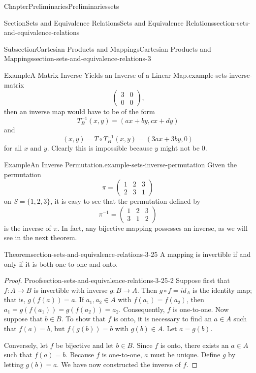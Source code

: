 \documentclass[oneside,10pt,]{book}
\numberwithin{equation}{section}
\begin{document}
\begin{chapterptx}{Chapter}{Preliminaries}{}{Preliminaries}{}{}{sets}
\begin{sectionptx}{Section}{Sets and Equivalence Relations}{}{Sets and Equivalence Relations}{}{}{section-sets-and-equivalence-relations}
\begin{subsectionptx}{Subsection}{Cartesian Products and Mappings}{}{Cartesian Products and Mappings}{}{}{section-sets-and-equivalence-relations-3}
\begin{example}{Example}{A Matrix Inverse Yields an Inverse of a Linear Map.}{example-sets-inverse-matrix}
\begin{equation*}
\begin{pmatrix}
3 & 0 \\
0 & 0
\end{pmatrix}\text{,}
\end{equation*}
then an inverse map would have to be of the form%
\begin{equation*}
T_B^{-1} (x,y) = (ax + by, cx +dy)
\end{equation*}
and%
\begin{equation*}
(x,y) = T \circ T_B^{-1} (x,y) = (3ax + 3by, 0)
\end{equation*}
for all \(x\) and \(y\).  Clearly this is  impossible because \(y\) might not be 0.%
\end{example}
\begin{example}{Example}{An Inverse Permutation.}{example-sets-inverse-permutation}%
Given the permutation%
\begin{equation*}
\pi =
\begin{pmatrix}
1 & 2 & 3 \\
2 & 3 & 1
\end{pmatrix}
\end{equation*}
on \(S = \{ 1,2,3 \}\), it is easy to see that the permutation defined by%
\begin{equation*}
\pi^{-1} =
\begin{pmatrix}
1 & 2 & 3 \\
3 & 1 & 2
\end{pmatrix}
\end{equation*}
is the inverse of \(\pi\).  In fact, any bijective mapping possesses an inverse, as we will see in the next theorem.%
\end{example}
\begin{theorem}{Theorem}{}{}{section-sets-and-equivalence-relations-3-25}%
A mapping is invertible if and only if it is both one-to-one and onto.%
\end{theorem}
\begin{proof}{Proof}{}{section-sets-and-equivalence-relations-3-25-2}
Suppose first that \(f:A \rightarrow B\) is invertible with inverse \(g: B \rightarrow A\). Then \(g \circ f = id_A\) is the identity map; that is, \(g(f(a)) = a\). If \(a_1, a_2 \in A\) with \(f(a_1) = f(a_2)\), then \(a_1 = g(f(a_1)) = g(f(a_2)) = a_2\).  Consequently, \(f\) is one-to-one.  Now suppose that \(b \in B\). To show that \(f\) is onto, it is necessary to find an \(a \in A\) such that \(f(a) = b\), but \(f(g(b)) = b\) with \(g(b) \in A\). Let \(a = g(b)\).%
\par
Conversely, let \(f\) be bijective and let \(b \in B\).  Since \(f\) is onto, there exists an \(a \in A\) such that \(f(a) = b\).  Because \(f\) is one-to-one, \(a\) must be unique. Define \(g\) by letting \(g(b) = a\).  We have now constructed the inverse of \(f\).%

\end{proof}
\end{subsectionptx}
\end{sectionptx}
\end{chapterptx}
\end{document}
